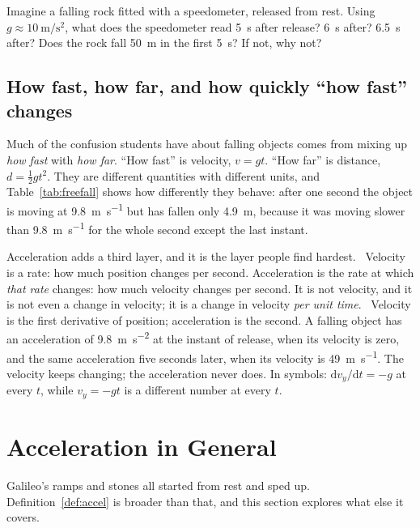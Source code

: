 \documentclass[11pt,twoside,openany]{book}
\newcommand{\dd}{\mathrm{d}}
\newcounter{check}[chapter]
\newcommand{\viewtag}[3]{\fcolorbox{#2}{#3}{\footnotesize\textbf{\textcolor{#2}{#1}}}}
\newcommand{\elemtag}{\viewtag{Elementary}{elemcol}{elempale}}
\newcommand{\calctag}{\viewtag{Calculus}{calccol}{calcpale}}
\begin{document}
\begin{checkbox}
Imagine a falling rock fitted with a speedometer, released from rest. Using $g \approx \SI{10}{\metre\per\second\squared}$, what does the speedometer read \SI{5}{\second} after release? \SI{6}{\second} after? \SI{6.5}{\second} after? Does the rock fall \SI{50}{\metre} in the first \SI{5}{\second}? If not, why not?
\end{checkbox}

\subsection{How fast, how far, and how quickly ``how fast'' changes}

Much of the confusion students have about falling objects comes from mixing up \emph{how fast} with \emph{how far}. ``How fast'' is velocity, $v = gt$. ``How far'' is distance, $d = \tfrac12 g t^2$. They are different quantities with different units, and Table~\ref{tab:freefall} shows how differently they behave: after one second the object is moving at \SI{9.8}{\metre\per\second} but has fallen only \SI{4.9}{\metre}, because it was moving slower than \SI{9.8}{\metre\per\second} for the whole second except the last instant.

Acceleration adds a third layer, and it is the layer people find hardest. \elemtag\ Velocity is a rate: how much position changes per second. Acceleration is the rate at which \emph{that rate} changes: how much velocity changes per second. It is not velocity, and it is not even a change in velocity; it is a change in velocity \emph{per unit time}. \calctag\ Velocity is the first derivative of position; acceleration is the second. A falling object has an acceleration of \SI{9.8}{\metre\per\second\squared} at the instant of release, when its velocity is zero, and the same acceleration five seconds later, when its velocity is \SI{49}{\metre\per\second}. The velocity keeps changing; the acceleration never does. In symbols: $\dd v_y/\dd t = -g$ at every $t$, while $v_y = -gt$ is a different number at every $t$.

\section{Acceleration in General}
\label{sec:accelgeneral}

Galileo's ramps and stones all started from rest and sped up. Definition~\ref{def:accel} is broader than that, and this section explores what else it covers.
\end{document}
